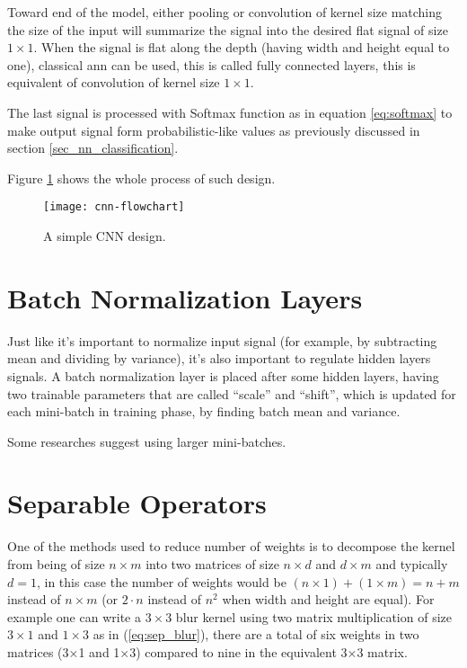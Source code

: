 Toward end of the model, either pooling or convolution of kernel size
matching the size of the input will summarize the signal into the desired flat signal of size \(1\times 1\).
When the signal is flat along the depth (having width and height equal to one),
classical \gls{ann} can be used, this is called fully connected layers,
this is equivalent of convolution of kernel size \(1\times 1\).

The last signal is processed with Softmax function as in equation \ref{eq:softmax} to make output signal
form probabilistic-like values as previously discussed in section \ref{sec_nn_classification}.

Figure \ref{fig:cnn-flowchart} shows the whole process of such design.

\begin{figure}[!ht]
\centering
\texttt{[image: cnn-flowchart]}
\caption{A simple CNN design.}\label{fig:cnn-flowchart}
\end{figure}


\section{Batch Normalization Layers}

Just like it's important to normalize input signal (for example, by subtracting mean and dividing by variance),
it's also important to regulate hidden layers signals.
A batch normalization layer\autocite{ioffe2015batch} is placed after some hidden layers,
having two trainable parameters that are called ``scale'' and ``shift'',
which is updated for each mini-batch in training phase, by finding batch mean and variance.

Some researches suggest using larger mini-batches\autocite{goyal2017accurate}.

\section{Separable Operators}

One of the methods used to reduce number of weights is to decompose the kernel from
being of size \( n \times m \) into two matrices of size \( n \times d \) and \( d \times m \)
and typically \( d=1 \), in this case the number of weights would be
\( (n\times 1)+(1\times m)=n+m\) instead of \(n\times m\)
(or \(2 \cdot n\) instead of \(n^2\) when width and height are equal).
For example one can write a \(3\times 3\) blur kernel using
two matrix multiplication of size \(3\times 1\) and \(1\times 3\) as in (\ref{eq:sep_blur}),
there are a total of six weights in two matrices (3×1 and 1×3) compared to nine in the equivalent 3×3 matrix.

